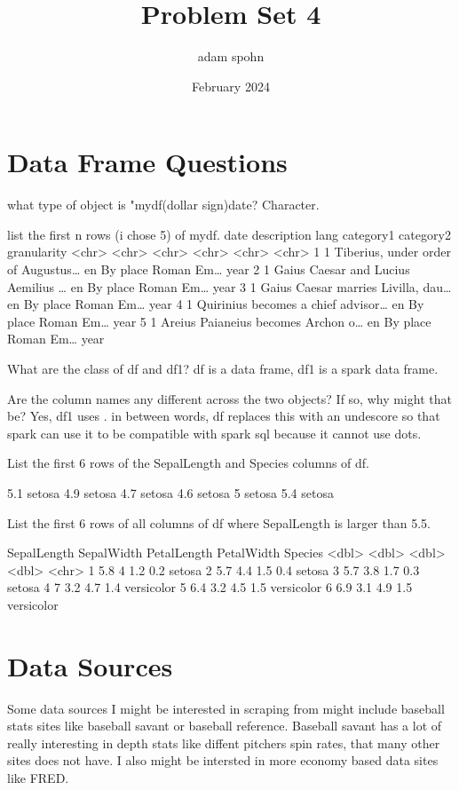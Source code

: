 \documentclass{article}
\title{Problem Set 4}
\author{adam spohn}
\date{February 2024}
\begin{document}
\maketitle

\section{Data Frame Questions}
what type of object is "mydf(dollar sign)date?
Character.

list the first n rows (i chose 5) of mydf.
 date  description                        lang  category1 category2 granularity
  <chr> <chr>                              <chr> <chr>     <chr>     <chr>      
1 1     Tiberius, under order of Augustus… en    By place  Roman Em… year       
2 1     Gaius Caesar and Lucius Aemilius … en    By place  Roman Em… year       
3 1     Gaius Caesar marries Livilla, dau… en    By place  Roman Em… year       
4 1     Quirinius becomes a chief advisor… en    By place  Roman Em… year       
5 1     Areius Paianeius becomes Archon o… en    By place  Roman Em… year       


What are the class of df and df1?
df is a data frame, df1 is a spark data frame.

Are the column names any different across the two objects? If so, why might that be?
Yes, df1 uses . in between words, df replaces this with an 
undescore so that spark can use it to be compatible with spark sql
because it cannot use dots.

List the first 6 rows of the SepalLength and Species columns of df.

5.1 setosa 
4.9 setosa 
4.7 setosa 
4.6 setosa 
5   setosa 
5.4 setosa 

List the first 6 rows of all columns of df where SepalLength is larger than 5.5.

SepalLength SepalWidth PetalLength PetalWidth Species   
         <dbl>       <dbl>        <dbl>       <dbl> <chr>     
1          5.8         4            1.2         0.2 setosa    
2          5.7         4.4          1.5         0.4 setosa    
3          5.7         3.8          1.7         0.3 setosa    
4          7           3.2          4.7         1.4 versicolor
5          6.4         3.2          4.5         1.5 versicolor
6          6.9         3.1          4.9         1.5 versicolor

\section{Data Sources}
Some data sources I might be interested in scraping from might
include baseball stats sites like baseball savant or baseball 
reference. Baseball savant has a lot of really interesting in
depth stats like diffent pitchers spin rates, that many other 
sites does not have. I also might be intersted in more economy 
based data sites like FRED.
\end{document}
